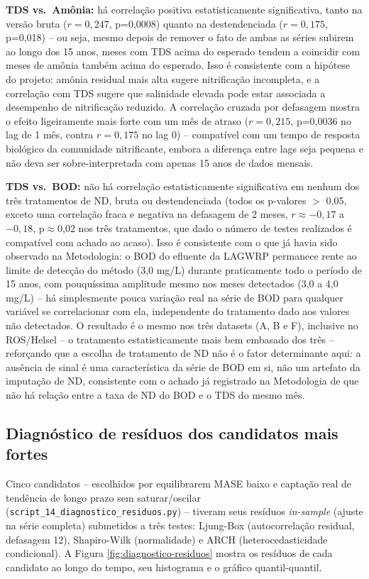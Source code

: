 \textbf{TDS vs.\ Amônia:} há correlação positiva estatisticamente significativa, tanto na versão bruta ($r=0{,}247$, p=0,0008) quanto na destendenciada ($r=0{,}175$, p=0,018) -- ou seja, mesmo depois de remover o fato de ambas as séries subirem ao longo dos 15 anos, meses com TDS acima do esperado tendem a coincidir com meses de amônia também acima do esperado. Isso é consistente com a hipótese do projeto: amônia residual mais alta sugere nitrificação incompleta, e a correlação com TDS sugere que salinidade elevada pode estar associada a desempenho de nitrificação reduzido. A correlação cruzada por defasagem mostra o efeito ligeiramente mais forte com um mês de atraso ($r=0{,}215$, p=0,0036 no lag de 1 mês, contra $r=0{,}175$ no lag 0) -- compatível com um tempo de resposta biológico da comunidade nitrificante, embora a diferença entre lags seja pequena e não deva ser sobre-interpretada com apenas 15 anos de dados mensais.

\textbf{TDS vs.\ BOD:} não há correlação estatisticamente significativa em nenhum dos três tratamentos de ND, bruta ou destendenciada (todos os p-valores $>$ 0,05, exceto uma correlação fraca e negativa na defasagem de 2 meses, $r\approx-0{,}17$ a $-0{,}18$, p$\approx$0,02 nos três tratamentos, que dado o número de testes realizados é compatível com achado ao acaso). Isso é consistente com o que já havia sido observado na Metodologia: o BOD do efluente da LAGWRP permanece rente ao limite de detecção do método (3,0 mg/L) durante praticamente todo o período de 15 anos, com pouquíssima amplitude mesmo nos meses detectados (3,0 a 4,0 mg/L) -- há simplesmente pouca variação real na série de BOD para qualquer variável se correlacionar com ela, independente do tratamento dado aos valores não detectados. O resultado é o mesmo nos três datasets (A, B e F), inclusive no ROS/Helsel -- o tratamento estatisticamente mais bem embasado dos três -- reforçando que a escolha de tratamento de ND não é o fator determinante aqui: a ausência de sinal é uma característica da série de BOD em si, não um artefato da imputação de ND, consistente com o achado já registrado na Metodologia de que não há relação entre a taxa de ND do BOD e o TDS do mesmo mês.

\subsection{Diagnóstico de resíduos dos candidatos mais fortes}

Cinco candidatos -- escolhidos por equilibrarem MASE baixo e captação real de tendência de longo prazo sem saturar/oscilar (\texttt{script\_14\_diagnostico\_residuos.py}) -- tiveram seus resíduos \textit{in-sample} (ajuste na série completa) submetidos a três testes: Ljung-Box (autocorrelação residual, defasagem 12), Shapiro-Wilk (normalidade) e ARCH (heterocedasticidade condicional). A Figura \ref{fig:diagnostico-residuos} mostra os resíduos de cada candidato ao longo do tempo, seu histograma e o gráfico quantil-quantil.

